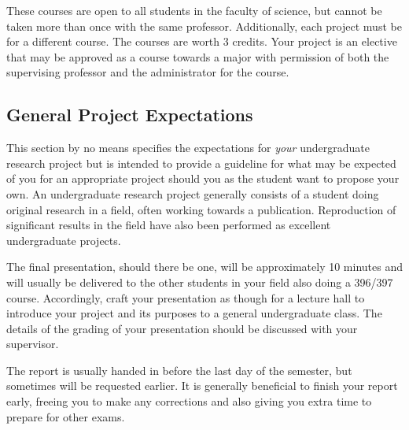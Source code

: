 		These courses are open to all students in the faculty of science, but cannot be taken more than once with the same professor.
		Additionally, each project must be for a different course.
		The courses are worth 3 credits.
		Your project is an elective that may be approved as a course towards a major with permission of both the supervising professor and the administrator for the course.
		
\subsection*{General Project Expectations}
		
		This section by no means specifies the expectations for \textit{your} undergraduate research project but is intended to provide a guideline for what may be expected of you for an appropriate project should you as the student want to propose your own.
		An undergraduate research project generally consists of a student doing original research in a field, often working towards a publication.
		Reproduction of significant results in the field have also been performed as excellent undergraduate projects.
		
		The final presentation, should there be one, will be approximately 10 minutes and will usually be delivered to the other students in your field also doing a 396/397 course.
		Accordingly, craft your presentation as though for a lecture hall to introduce your project and its purposes to a general undergraduate class.
		The details of the grading of your presentation should be discussed with your supervisor.
		
		The report is usually handed in before the last day of the semester, but sometimes will be requested earlier.
		It is generally beneficial to finish your report early, freeing you to make any corrections and also giving you extra time to prepare for other exams.
		


